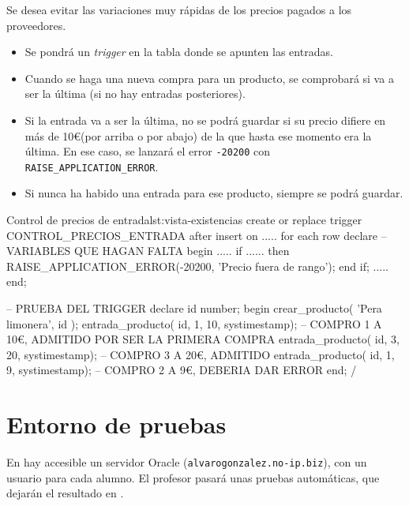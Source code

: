 \begin{homeworkProblem}

  Se desea evitar las variaciones muy rápidas de los precios pagados a los proveedores.
  \begin{itemize}
  \item Se pondrá un \textit{trigger} en la tabla donde se apunten las entradas.
  \item Cuando se haga una nueva compra para un producto, se comprobará si va a ser la última (si no hay entradas posteriores).
  \item Si la entrada va a ser la última, no se podrá guardar si su precio difiere en más de 10\euro (por arriba o por abajo) de la que hasta ese momento era la última. En ese caso, se lanzará el error \texttt{-20200} con \texttt{RAISE\_APPLICATION\_ERROR}.
  \item Si nunca ha habido una entrada para ese producto, siempre se podrá guardar.
\end{itemize}

  \begin{listadosql}{Control de precios de entrada}{lst:vista-existencias}
create or replace trigger CONTROL_PRECIOS_ENTRADA
after insert on .....
for each row 
declare
  -- VARIABLES QUE HAGAN FALTA
begin
  .....
  if ...... then
    RAISE_APPLICATION_ERROR(-20200, 'Precio fuera de rango');
  end if;
  .....
end;

-- PRUEBA DEL TRIGGER
declare
  id number;
begin
  crear_producto( 'Pera limonera', id );
  entrada_producto( id, 1, 10, systimestamp); -- COMPRO 1 A 10€, ADMITIDO POR SER LA PRIMERA COMPRA
  entrada_producto( id, 3, 20, systimestamp); -- COMPRO 3 A 20€, ADMITIDO
  entrada_producto( id, 1, 9, systimestamp); -- COMPRO 2 A 9€, DEBERIA DAR ERROR
end;
/

  \end{listadosql}  
  
\end{homeworkProblem}


\section{Entorno de pruebas}
En hay accesible un servidor Oracle (\texttt{alvarogonzalez.no-ip.biz}), con un usuario para cada alumno.
El profesor pasará unas pruebas automáticas, que dejarán el resultado en .


